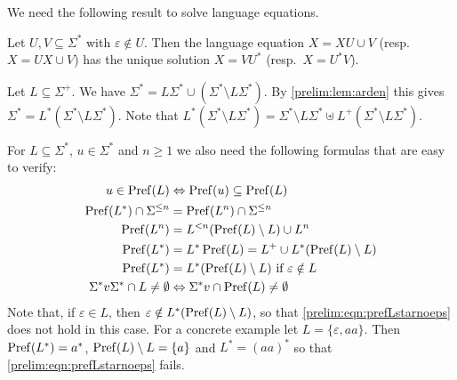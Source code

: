 We need the following result to solve language equations.

\begin{lemma}\label{prelim:lem:arden}
	Let $U, V \subseteq \Sigma^*$ with $\varepsilon \notin U$.
	Then the language equation $X = XU \cup V$ (resp.~$X = UX \cup V$)
	has the unique solution $X = VU^*$ (resp.~$X = U^*V$).
\end{lemma}

\begin{example} \label{prelim:eqn:Sigmastarpartition}
	Let $L \subseteq \Sigma^+$.
	We have $\Sigma^* = L \Sigma^* \cup (\Sigma^* \setminus L\Sigma^*)$.
	By \cref{prelim:lem:arden} this gives
	$\Sigma^* = L^* ( \Sigma^* \setminus L\Sigma^* )$.	
	Note that
	$L^* ( \Sigma^* \setminus L\Sigma^* ) =  \Sigma^* \setminus L\Sigma^* \uplus L^+ (  \Sigma^* \setminus L\Sigma^* )$.	
\end{example}

For $L \subseteq \Sigma^*$, $u \in \Sigma^*$ and $n \ge 1$
we also need the following formulas that are easy to verify:
\begingroup
\allowdisplaybreaks 
\begin{align}
		u \in \pref{L}  & \Leftrightarrow \pref{u} \subseteq \pref{L} \label{prelim:eqn:prefu} \\
		\pref{L^*} \cap \Sigma^{\le n} & = \pref{L^n} \cap \Sigma^{\le n}  \label{constrsync:eqn:Lm} \\
		\pref{L^n} & = L^{< n} ( \pref{L} \setminus L ) \cup L^n \label{constrsync:eqn:perfLn} \\
		\pref{L^*} & = L^*\pref{L} = L^+ \cup L^* ( \pref{L} \setminus L )  \label{prelim:eqn:prefLstar}  \\
		\pref{L^*} & = L^* ( \pref{L} \setminus L ) \text{ if } \varepsilon \notin L %
		\label{prelim:eqn:prefLstarnoeps} \\
		\Sigma^* v \Sigma^* \cap L \ne \emptyset & \Leftrightarrow \Sigma^*v \cap \pref{L} \ne \emptyset
\end{align}
\endgroup%
Note that, if $\varepsilon \in L$,
then $\varepsilon \notin L^* (\operatorname{Pref}(L) \setminus L)$,
so that \cref{prelim:eqn:prefLstarnoeps} does not hold in this case. For a concrete example
let $L = \{\varepsilon, aa\}$. Then $\operatorname{Pref}(L^*) = a^*$, 
$\operatorname{Pref}(L) \setminus L = \{a\}$ and $L^* = (aa)^*$
so that \cref{prelim:eqn:prefLstarnoeps} fails.

